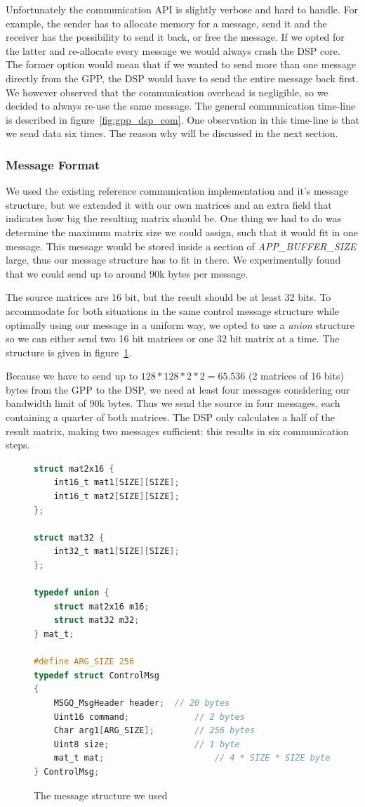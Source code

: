 Unfortunately the communication API is slightly verbose and hard to handle.
For example, the sender has to allocate memory for a message, send it and the
receiver has the possibility to send it back, or free the message. If we opted
for the latter and re-allocate every message we would always crash the DSP core.
The former option would mean that if we wanted to send more than one message
directly from the GPP, the DSP would have to send the entire message back first.
We however observed that the communication overhead is negligible, so we
decided to always re-use the same message. The general communication time-line
is described in figure~\ref{fig:gpp_dsp_com}. One observation in this time-line
is that we send data six times. The reason why will be discussed in the next
section.

\subsubsection{Message Format}
We used the existing reference communication implementation and it's message
structure, but we extended it with our own matrices and an extra field that
indicates how big the resulting matrix should be. One thing we had to do
was determine the maximum matrix size we could assign, such that it would fit
in one message. This message would be stored inside a section of
\emph{APP\_BUFFER\_SIZE} large, thus our message structure has to fit in there.
We experimentally found that we could send up to around 90k bytes per message.

The source matrices are 16 bit, but the result should be at least 32 bits.
To accommodate for both
situations in the same control message structure while optimally using our
message in a uniform way, we opted to use a \emph{union} structure so we
can either send two 16 bit matrices or one 32 bit matrix at a time. The
structure is given in figure~\ref{code:control_msg}.

Because we have to send up to $128*128*2*2=65.536$ (2 matrices of 16 bits)
bytes from the GPP to the DSP, we need at least four messages considering
our bandwidth limit of 90k bytes. Thus we send the source in four messages,
each containing a quarter of both matrices. The DSP only calculates a half of
the result matrix, making two messages sufficient: this results in six
communication steps.

\begin{figure}[h]
\begin{lstlisting}[language=C]
struct mat2x16 {
	int16_t mat1[SIZE][SIZE];
	int16_t mat2[SIZE][SIZE];
};

struct mat32 {
	int32_t mat1[SIZE][SIZE];
};

typedef union {
	struct mat2x16 m16;
	struct mat32 m32;
} mat_t;

#define ARG_SIZE 256
typedef struct ControlMsg
{
    MSGQ_MsgHeader header;	// 20 bytes
    Uint16 command;				// 2 bytes
    Char arg1[ARG_SIZE];		// 256 bytes
    Uint8 size;					// 1 byte
    mat_t mat;						// 4 * SIZE * SIZE bytes
} ControlMsg;
\end{lstlisting}
\caption{The message structure we used}
\label{code:control_msg}
\end{figure}
